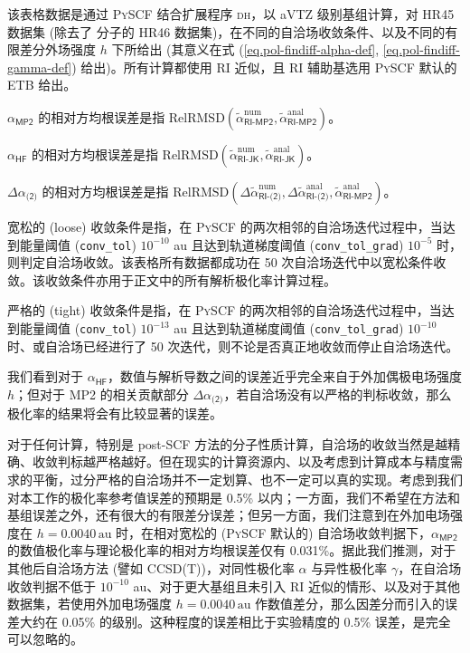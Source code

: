 \begin{table}[ht]
    \raggedright
    \par{} 该表格数据是通过 \textsc{PySCF} 结合扩展程序 \textsc{dh}，以 aVTZ 级别基组计算，对 HR45 数据集 (除去了  分子的 HR46 数据集)，在不同的自洽场收敛条件、以及不同的有限差分外场强度 $h$ 下所给出 (其意义在式 (\ref{eq.pol-findiff-alpha-def}, \ref{eq.pol-findiff-gamma-def}) 给出)。所有计算都使用 RI 近似，且 RI 辅助基选用 \textsc{PySCF} 默认的 ETB 给出。
    \par{} $\alpha_\textsf{MP2}$ 的相对方均根误差是指 $\text{RelRMSD} (\tilde \alpha^\text{num}_\textsf{RI-MP2}, \tilde \alpha^\text{anal}_\textsf{RI-MP2})$。
    \par{} $\alpha_\textsf{HF}$ 的相对方均根误差是指 $\text{RelRMSD} (\tilde \alpha^\text{num}_\textsf{RI-JK}, \tilde \alpha^\text{anal}_\textsf{RI-JK})$。
    \par{} $\Delta \alpha_\textsf{(2)}$ 的相对方均根误差是指 $\text{RelRMSD} (\Delta \tilde \alpha^\text{num}_\textsf{RI-(2)}, \Delta \tilde \alpha^\text{anal}_\textsf{RI-(2)}, \tilde \alpha^\text{anal}_\textsf{RI-MP2})$。
    \par{} 宽松的 (loose) 收敛条件是指，在 \textsc{PySCF} 的两次相邻的自洽场迭代过程中，当达到能量阈值 (\texttt{conv\_tol}) $10^{-10}$ au 且达到轨道梯度阈值 (\texttt{conv\_tol\_grad}) $10^{-5}$ 时，则判定自洽场收敛。该表格所有数据都成功在 50 次自洽场迭代中以宽松条件收敛。该收敛条件亦用于正文中的所有解析极化率计算过程。
    \par{} 严格的 (tight) 收敛条件是指，在 \textsc{PySCF} 的两次相邻的自洽场迭代过程中，当达到能量阈值 (\texttt{conv\_tol}) $10^{-13}$ au 且达到轨道梯度阈值 (\texttt{conv\_tol\_grad}) $10^{-10}$ 时、或自洽场已经进行了 50 次迭代，则不论是否真正地收敛而停止自洽场迭代。
\end{table}

我们看到对于 $\alpha_\textsf{HF}$，数值与解析导数之间的误差近乎完全来自于外加偶极电场强度 $h$；但对于 MP2 的相关贡献部分 $\Delta \alpha_\textsf{(2)}$，若自洽场没有以严格的判标收敛，那么极化率的结果将会有比较显著的误差。

对于任何计算，特别是 post-SCF 方法的分子性质计算，自洽场的收敛当然是越精确、收敛判标越严格越好。但在现实的计算资源内、以及考虑到计算成本与精度需求的平衡，过分严格的自洽场并不一定划算、也不一定可以真的实现。考虑到我们对本工作的极化率参考值误差的预期是 0.5\% 以内；一方面，我们不希望在方法和基组误差之外，还有很大的有限差分误差；但另一方面，我们注意到在外加电场强度在 $h = 0.0040 \, \text{au}$ 时，在相对宽松的 (\textsc{PySCF} 默认的) 自洽场收敛判据下，$\alpha_\textsf{MP2}$ 的数值极化率与理论极化率的相对方均根误差仅有 0.031\%。据此我们推测，对于其他后自洽场方法 (譬如 CCSD(T))，对同性极化率 $\alpha$ 与异性极化率 $\gamma$，在自洽场收敛判据不低于 $10^{-10}$ au、对于更大基组且未引入 RI 近似的情形、以及对于其他数据集，若使用外加电场强度 $h = 0.0040 \, \text{au}$ 作数值差分，那么因差分而引入的误差大约在 0.05\% 的级别。这种程度的误差相比于实验精度的 0.5\% 误差，是完全可以忽略的。

